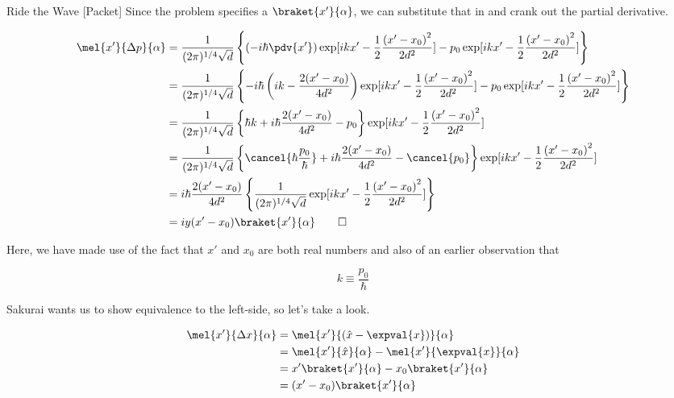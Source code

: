 \begin{answer}
\begin{answerpart}{Ride the Wave [Packet]}
    Since the problem specifies a $\braket{x'}{\alpha}$, we can
    substitute that in and crank out the partial derivative.

    \begin{equation}
      \begin{split}
        \mel{x'}{\Delta p}{\alpha}
        &=
        \frac{1}{(2\pi)^{1/4}\sqrt{d}}
        \left\{
        \left(-i \hbar \pdv{x'}\right)
        \exp[ikx' - \frac{1}{2}\frac{\left(x' - x_0\right)^2}{2d^2}]
        - p_0\exp[ikx' - \frac{1}{2}\frac{\left(x' - x_0\right)^2}{2d^2}]
        \right\}\\
        &=
        \frac{1}{(2\pi)^{1/4}\sqrt{d}}
        \left\{
        -i \hbar
        \left(ik - \frac{2(x'-x_0)}{4d^2} \right)
        \exp[ikx' - \frac{1}{2}\frac{\left(x' - x_0\right)^2}{2d^2}]
        - p_0\exp[ikx' - \frac{1}{2}\frac{\left(x' - x_0\right)^2}{2d^2}]
        \right\}\\
        &=
        \frac{1}{(2\pi)^{1/4}\sqrt{d}}
        \left\{
        \hbar k  + i\hbar\frac{2(x' - x_0)}{4d^2}
        - p_0
        \right\}
        \exp[ikx' - \frac{1}{2}\frac{\left(x' - x_0\right)^2}{2d^2}]
        \\
        &=
        \frac{1}{(2\pi)^{1/4}\sqrt{d}}
        \left\{
        \cancel{\hbar \frac{p_0}{\hbar}}  + i\hbar\frac{2(x' - x_0)}{4d^2}
        - \cancel{p_0}
        \right\}
        \exp[ikx' - \frac{1}{2}\frac{\left(x' - x_0\right)^2}{2d^2}]
        \\
        &=
        i\hbar\frac{2(x' - x_0)}{4d^2}
        \left\{
        \frac{1}{(2\pi)^{1/4}\sqrt{d}}
        \exp[ikx' - \frac{1}{2}\frac{\left(x' - x_0\right)^2}{2d^2}]
        \right\}
        \\
        &=
        iy(x' - x_0)\braket{x'}{\alpha}\qed
        \\
      \end{split}
    \end{equation}

    Here, we have made use of the fact that $x'$ and $x_0$ are both
    real numbers and also of an earlier observation that

    \begin{equation}
      k \equiv \frac{p_0}{\hbar}
    \end{equation}

    Sakurai wants us to show equivalence to the left-side, so let's
    take a look.

    \begin{equation}
      \begin{split}
        \mel{x'}{\Delta x}{\alpha}
        &= \mel{x'}{(\hat{x} - \expval{x})}{\alpha}\\
        &= \mel{x'}{\hat{x}}{\alpha} - \mel{x'}{\expval{x}}{\alpha}\\
        &= x'\braket{x'}{\alpha} - x_0\braket{x'}{\alpha}\\
        &= (x' - x_0)\braket{x'}{\alpha}\\
      \end{split}
    \end{equation}


\end{answerpart}
\end{answer}
